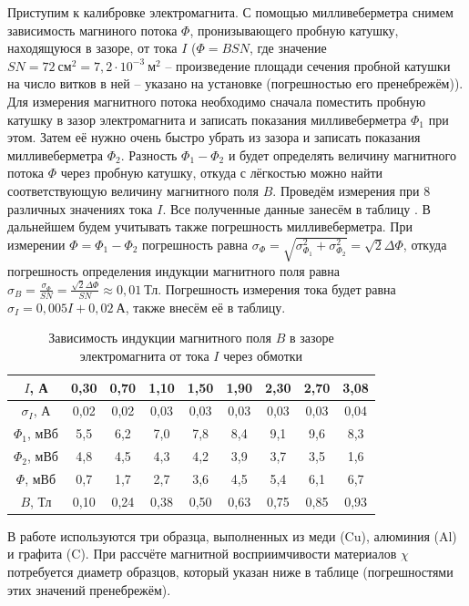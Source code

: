 \documentclass[a4paper,12pt]{article}
\begin{document}
Приступим к калибровке электромагнита. С помощью милливеберметра снимем зависимость магниного потока $\Phi$, пронизывающего пробную катушку, находящуюся в зазоре, от тока $I$ ($\Phi=BSN$, где значение $SN=72~\text{см}^2=7,2\cdot10^{-3}~\text{м}^2$ -- произведение площади сечения пробной катушки на число витков в ней -- указано на установке (погрешностью его пренебрежём)). Для измерения магнитного потока необходимо сначала поместить пробную катушку в зазор электромагнита и записать показания милливеберметра $\Phi_1$ при этом. Затем её нужно очень быстро убрать из зазора и записать показания милливеберметра $\Phi_2$. Разность $\Phi_1-\Phi_2$ и будет определять величину магнитного потока $\Phi$ через пробную катушку, откуда с лёгкостью можно найти соответствующую величину магнитного поля $B$. Проведём измерения при 8 различных значениях тока $I$. Все полученные данные занесём в таблицу . В дальнейшем будем учитывать также погрешность милливеберметра. При измерении $\Phi=\Phi_1-\Phi_2$ погрешность равна $\sigma_{\Phi}=\sqrt{\sigma_{\Phi_1}^2+\sigma_{\Phi_2}^2}=\sqrt2\Delta\Phi$, откуда погрешность определения индукции магнитного поля равна $\sigma_B=\frac{\sigma_{\Phi}}{SN}=\frac{\sqrt2\Delta\Phi}{SN}\approx0,01~\text{Тл}$. Погрешность измерения тока будет равна $\sigma_I=0,005I+0,02~\text{А}$, также внесём её в таблицу.

\begin{table}[h]
	\centering
	\caption{Зависимость индукции магнитного поля $B$ в зазоре электромагнита от тока $I$ через обмотки} \label{Калибровка}
	\begin{tabular}{|c|c|c|c|c|c|c|c|c|}
		\hline
		$I$, А & 0,30 & 0,70 & 1,10 & 1,50 & 1,90 & 2,30 & 2,70 & 3,08 \\ \hline
		$\sigma_I$, А & 0,02 & 0,02 & 0,03 & 0,03 & 0,03 & 0,03 & 0,03 & 0,04 \\ \hline
		$\Phi_1$, мВб & 5,5 & 6,2 & 7,0 & 7,8 & 8,4 & 9,1 & 9,6 & 8,3 \\ \hline
		$\Phi_2$, мВб & 4,8 & 4,5 & 4,3 & 4,2 & 3,9 & 3,7 & 3,5 & 1,6 \\ \hline
		$\Phi$, мВб & 0,7 & 1,7 & 2,7 & 3,6 & 4,5 & 5,4 & 6,1 & 6,7 \\ \hline
		$B$, Тл & 0,10 & 0,24 & 0,38 & 0,50 & 0,63 & 0,75 & 0,85 & 0,93 \\ \hline
	\end{tabular}
\end{table}

В работе используются три образца, выполненных из меди (Cu), алюминия (Al) и графита (C). При рассчёте магнитной восприимчивости материалов $\chi$ потребуется диаметр образцов, который указан ниже в таблице  (погрешностями этих значений пренебрежём).
\end{document}
